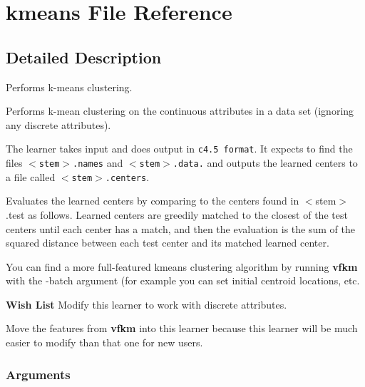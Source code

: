 \section{kmeans File Reference}
\label{kmeans}


\subsection{Detailed Description}
Performs k-means clustering. 

Performs k-mean clustering on the continuous attributes in a data set (ignoring any discrete attributes).

The learner takes input and does output in {\tt c4.5 format}. It expects to find the files {\tt $<$stem$>$.names} and {\tt $<$stem$>$.data.} and outputs the learned centers to a file called {\tt $<$stem$>$.centers}.

Evaluates the learned centers by comparing to the centers found in $<$stem$>$.test as follows. Learned centers are greedily matched to the closest of the test centers until each center has a match, and then the evaluation is the sum of the squared distance between each test center and its matched learned center.

You can find a more full-featured kmeans clustering algorithm by running {\bf vfkm} with the -batch argument (for example you can set initial centroid locations, etc.

\begin{Desc}
\item[{\bf Wish List}]Modify this learner to work with discrete attributes. 

Move the features from {\bf vfkm} into this learner because this learner will be much easier to modify than that one for new users. \end{Desc}


\subsubsection*{Arguments}

